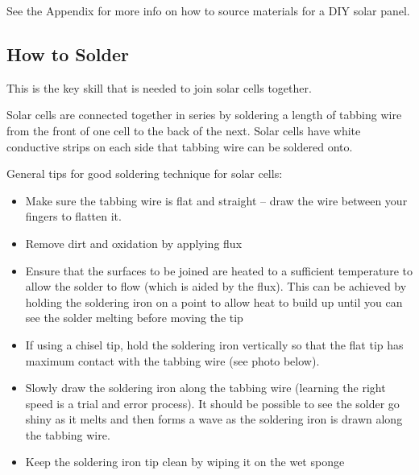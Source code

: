 \documentclass{article}
\theoremstyle{definition}
\theoremstyle{definition}
\theoremstyle{remark}
\begin{document}
    See the Appendix for more info on how to source materials for a DIY solar panel.
  

  {\color{blue}\subsection{How to Solder}} %
  \label{sub:how_to_solder}

    This is the key skill that is needed to join solar cells together.

    Solar cells are connected together in series by soldering a length of tabbing wire from the front of one cell to the back of the next. Solar cells have white conductive strips on each side that tabbing wire can be soldered onto. 

    General tips for good soldering technique for solar cells:

    \begin{itemize}
      \item Make sure the tabbing wire is flat and straight – draw the wire between your fingers to flatten it.
      \item Remove dirt and oxidation by applying flux
      \item Ensure that the surfaces to be joined are heated to a sufficient temperature to allow the solder to flow (which is aided by the flux). This can be achieved by holding the soldering iron on a point to allow heat to build up until you can see the solder melting before moving the tip
      \item If using a chisel tip, hold the soldering iron vertically so that the flat tip has maximum contact with the tabbing wire (see photo below).
      \item Slowly draw the soldering iron along the tabbing wire (learning the right speed is a trial and error process). It should be possible to see the solder go shiny as it melts and then forms a wave as the soldering iron is drawn along the tabbing wire.
      \item Keep the soldering iron tip clean by wiping it on the wet sponge
    \end{itemize}
\end{document}
